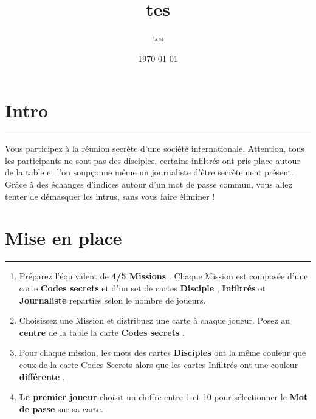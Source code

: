\documentclass{article}%
\title{tes}%
\author{tes}%
\date{\today}%
\begin{document}
%
\normalsize%
\maketitle\thispagestyle{header}%
\pagestyle{header}%
\sectionfont{\color{blue}}%
\subsectionfont{\color{blue}}%
\subsubsectionfont{\color{blue}}%
\section{ Intro
}%
\label{sec:Intro}%
\textcolor{blue}{\rule{18cm}{0.07cm}}\break%
Vous participez à la réunion secrète d'une société internationale. Attention, tous les participants ne sont pas des disciples, certains infiltrés ont pris place autour de la table et l'on soupçonne même un journaliste d'être secrètement présent. Grâce à des échanges d'indices autour d'un mot de passe commun, vous allez tenter de démasquer les intrus, sans vous faire éliminer !


%
\sectionfont{\color{mygreen}}%
\subsectionfont{\color{mygreen}}%
\subsubsectionfont{\color{mygreen}}%
\section{ Mise en place
}%
\label{sec:Miseenplace}%
\textcolor{mygreen}{\rule{18cm}{0.07cm}}\break%
\begin{enumerate}%
\item%
%
 Préparez l'équivalent de %
\textcolor{mygreen}{%
\textbf{4/5 Missions}%
}%
. Chaque Mission est composée d'une carte %
\textcolor{mygreen}{%
\textbf{Codes secrets}%
}%
\textit{ }%
 et d'un set de cartes %
\textcolor{mygreen}{%
\textbf{Disciple}%
}%
,%
\textcolor{mygreen}{%
\textbf{ Infiltrés}%
}%
\textit{ }%
 et %
\textcolor{mygreen}{%
\textbf{Journaliste}%
}%
\textit{ }%
 reparties selon le nombre de joueurs.
%
\item%
%
 Choisissez une Mission et distribuez une carte à chaque joueur. Posez au %
\textcolor{mygreen}{%
\textbf{centre}%
}%
\textit{ }%
 de la table la carte %
\textcolor{mygreen}{%
\textbf{Codes secrets}%
}%
.
%
\item%
%
 Pour chaque mission, les mots des cartes %
\textcolor{mygreen}{%
\textbf{Disciples}%
}%
\textit{ }%
 ont la même couleur que ceux de la carte Codes Secrets alors que les cartes Infiltrés ont une couleur %
\textcolor{mygreen}{%
\textbf{différente}%
}%
.
%
\item%
%
\textcolor{mygreen}{%
\textbf{Le premier joueur}%
}%
\textit{ }%
 choisit un chiffre entre 1 et 10 pour sélectionner le %
\textcolor{mygreen}{%
\textbf{Mot de passe}%
}%
\textit{ }%
 sur sa carte.
%
\end{enumerate}
\end{document}
